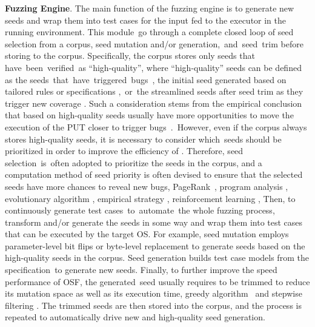 \textbf{Fuzzing Engine}. The main function of the fuzzing engine is to generate new seeds and wrap them into test cases for the input fed to the executor in the running environment. This module~go through a complete closed loop of seed selection from a corpus, seed mutation and/or generation,~and~seed~trim before storing to the corpus. Specifically, the corpus stores only seeds that have~been~verified~as ``high-quality'', where ``high-quality'' seeds can be defined as the seeds~that~have~triggered~bugs~\cite{zou2022syzscope, wu2018fuze,lin2022grebe,shen2021rtkaller}, the initial seed generated based on tailored rules \cite{shen2022drifuzz} or specifications \cite{Syzkaller},~or~the streamlined seeds after seed trim as they trigger new coverage \cite{pailoor2018moonshine, shen2021rtkaller}. Such a consideration stems from the empirical conclusion that  based on high-quality seeds usually have more opportunities to move the execution of the PUT closer to trigger bugs~\cite{you2017semfuzz, shen2022drifuzz, lin2022grebe, Unicorefuzz2019}.~However, even if the corpus always stores high-quality seeds, it is necessary to consider which~seeds should be prioritized in order to improve the efficiency of . Therefore, seed selection~is~often adopted to prioritize the seeds in the corpus, and a computation method of seed priority is often devised to ensure that the selected seeds have more chances to reveal new bugs, \eg PageRank~\cite{lin2022grebe}, program analysis \cite{wu2018fuze, chen2022sfuzz}, evolutionary algorithm \cite{shen2022drifuzz, henderson2017vdf, xu2020krace}, empirical strategy \cite{xu2020krace, Syzkaller, you2017semfuzz, zou2022syzscope}, reinforcement learning \cite{wang2021syzvegas}, \etc Then, to continuously generate test cases~to~automate~the whole fuzzing process,   transform and/or generate the seeds in some way and wrap them into test cases that can be executed by the target OS. For example, seed mutation employs parameter-level bit flips or byte-level replacement to generate seeds based on the high-quality seeds in the corpus. Seed generation builds test case models from the specification~to generate new seeds. Finally, to further improve the speed performance of OSF, the generated~seed usually requires to be trimmed to reduce its mutation space as well as its execution time, \eg greedy algorithm~\cite{pailoor2018moonshine} and stepwise filtering \cite{schumilo2020hyper, henderson2017vdf}. The trimmed seeds are then stored into the corpus, and the process is repeated to automatically drive new and high-quality seed generation.

